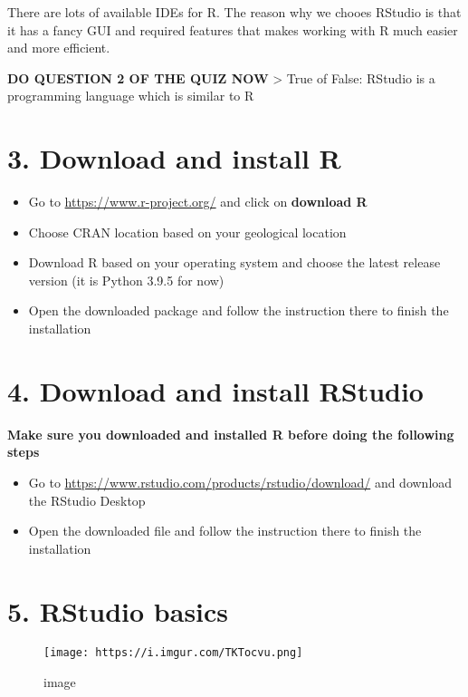 \documentclass[
]{book}
\begin{document}
There are lots of available IDEs for R. The reason why we chooes RStudio is that it has a fancy GUI and required features that makes working with R much easier and more efficient.

\textbf{DO QUESTION 2 OF THE QUIZ NOW}
\textgreater{} True of False: RStudio is a programming language which is similar to R

\hypertarget{download-and-install-r}{%
\section{3. Download and install R}\label{download-and-install-r}}

\begin{itemize}
\item
  Go to \url{https://www.r-project.org/} and click on \textbf{download R}
\item
  Choose CRAN location based on your geological location
\item
  Download R based on your operating system and choose the latest release version (it is Python 3.9.5 for now)
\item
  Open the downloaded package and follow the instruction there to finish the installation
\end{itemize}

\hypertarget{download-and-install-rstudio}{%
\section{4. Download and install RStudio}\label{download-and-install-rstudio}}

\textbf{Make sure you downloaded and installed R before doing the following steps}

\begin{itemize}
\item
  Go to \url{https://www.rstudio.com/products/rstudio/download/} and download the RStudio Desktop
\item
  Open the downloaded file and follow the instruction there to finish the installation
\end{itemize}

\hypertarget{rstudio-basics}{%
\section{5. RStudio basics}\label{rstudio-basics}}

\begin{figure}
\centering
\texttt{[image: https://i.imgur.com/TKTocvu.png]}
\caption{image}
\end{figure}
\end{document}
